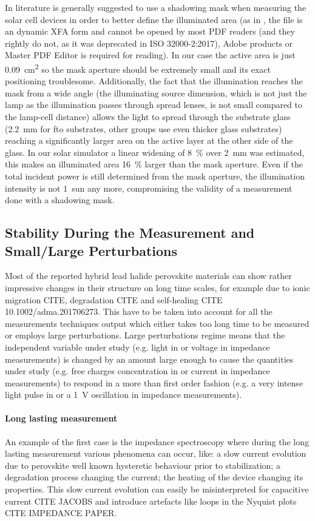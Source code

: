 In literature is generally suggested to use a shadowing mask when measuring the solar cell devices in order to better define the illuminated area (as in \cite{NatureResearch2017}, the file is an dynamic XFA form and cannot be opened by most PDF readers (and they rightly do not, as it was deprecated in ISO 32000-2:2017), Adobe products or Master PDF Editor is required for reading). In our case the active area is just \SI{0.09}{\square\cm} so the mask aperture should be extremely small and its exact positioning troublesome. Additionally, the fact that the illumination reaches the mask from a wide angle (the illuminating source dimension, which is not just the lamp as the illumination passes through spread lenses, is not small compared to the lamp-cell distance) allows the light to spread through the substrate glass (\SI{2.2}{\mm} for \gls{fto} substrates, other groups use even thicker glass substrates) reaching a significantly larger area on the active layer at the other side of the glass. In our solar simulator a linear widening of 8~\% over \SI{2}{\mm} was estimated, this makes an illuminated area 16~\% larger than the mask aperture. Even if the total incident power is still determined from the mask aperture, the illumination intensity is not 1~sun any more, compromising the validity of a measurement done with a shadowing mask.


\subsection{Stability During the Measurement and Small/Large Perturbations}

	Most of the reported hybrid lead halide perovskite materials can show rather impressive changes in their structure on long time scales, for example due to ionic migration CITE, degradation CITE and self-healing CITE 10.1002/adma.201706273.
	This have to be taken into account for all the measurements techniques output which either takes too long time to be measured or employs large perturbations. Large perturbations regime means that the independent variable under study (e.g. light in  or voltage in impedance measurements) is changed by an amount large enough to cause the quantities under study (e.g. free charges concentration in  or current in impedance measurements) to respond in a more than first order fashion (e.g. a very intense light pulse in  or a \SI{1}{\volt} oscillation in impedance measurements).
	
	\paragraph{Long lasting measurement} An example of the first case is the impedance spectroscopy where during the long lasting measurement various phenomena can occur, like: a slow current evolution due to perovskite well known hysteretic behaviour prior to stabilization; a degradation process changing the current; the heating of the device changing its properties. This slow current evolution can easily be misinterpreted for capacitive current CITE JACOBS and introduce artefacts like loops in the Nyquist plots CITE IMPEDANCE PAPER.
	
